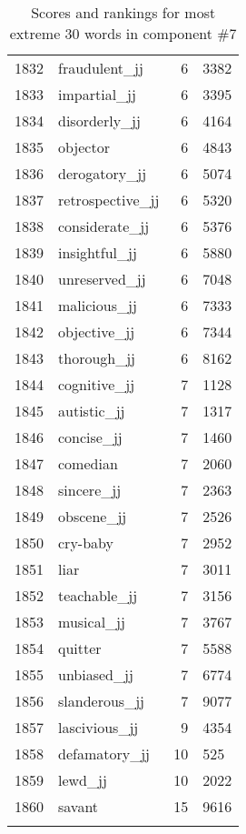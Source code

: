 \begin{longtable}[!htbp]{| rlr@{.}l |}
    1832 & fraudulent\_jj & 6 & 3382 \\
    1833 & impartial\_jj & 6 & 3395 \\
    1834 & disorderly\_jj & 6 & 4164 \\
    1835 & objector & 6 & 4843 \\
    1836 & derogatory\_jj & 6 & 5074 \\
    1837 & retrospective\_jj & 6 & 5320 \\
    1838 & considerate\_jj & 6 & 5376 \\
    1839 & insightful\_jj & 6 & 5880 \\
    1840 & unreserved\_jj & 6 & 7048 \\
    1841 & malicious\_jj & 6 & 7333 \\
    1842 & objective\_jj & 6 & 7344 \\
    1843 & thorough\_jj & 6 & 8162 \\
    1844 & cognitive\_jj & 7 & 1128 \\
    1845 & autistic\_jj & 7 & 1317 \\
    1846 & concise\_jj & 7 & 1460 \\
    1847 & comedian & 7 & 2060 \\
    1848 & sincere\_jj & 7 & 2363 \\
    1849 & obscene\_jj & 7 & 2526 \\
    1850 & cry-baby & 7 & 2952 \\
    1851 & liar & 7 & 3011 \\
    1852 & teachable\_jj & 7 & 3156 \\
    1853 & musical\_jj & 7 & 3767 \\
    1854 & quitter & 7 & 5588 \\
    1855 & unbiased\_jj & 7 & 6774 \\
    1856 & slanderous\_jj & 7 & 9077 \\
    1857 & lascivious\_jj & 9 & 4354 \\
    1858 & defamatory\_jj & 10 & 525 \\
    1859 & lewd\_jj & 10 & 2022 \\
    1860 & savant & 15 & 9616 \\
    \hline
    \caption{Scores and rankings for most extreme 30 words in component \#7} \\
\end{longtable}
